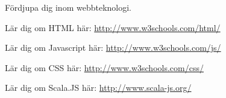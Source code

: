 \Task Fördjupa dig inom webbteknologi. 
    
\Subtask Lär dig om HTML här: \url{http://www.w3schools.com/html/}

\Subtask Lär dig om Javascript här: \url{http://www.w3schools.com/js/}

\Subtask Lär dig om CSS här: \url{http://www.w3schools.com/css/}

\Subtask Lär dig om Scala.JS här: \url{http://www.scala-js.org/}



